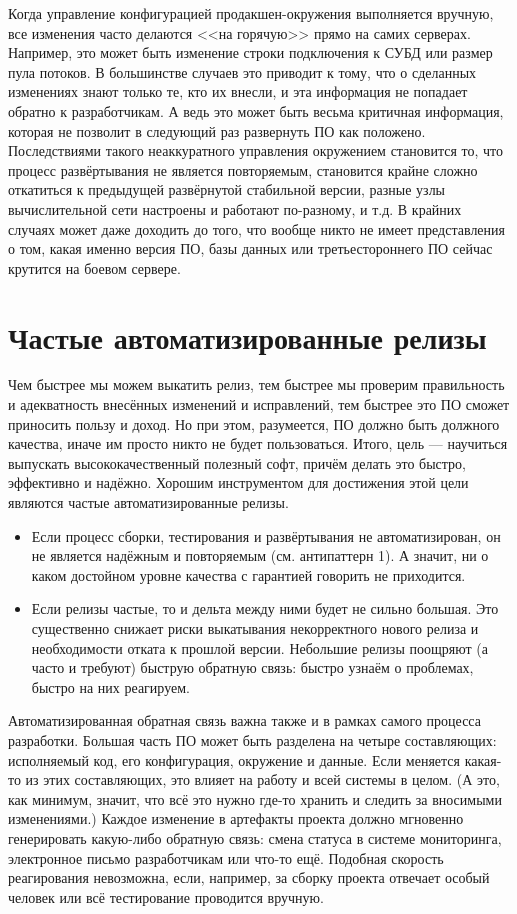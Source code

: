 \documentclass{../../text-style}
\begin{document}
Когда управление конфигурацией продакшен-окружения выполняется вручную, все изменения часто делаются <<на горячую>> прямо на самих серверах. Например, это может быть изменение строки подключения к СУБД или размер пула потоков. В большинстве случаев это приводит к тому, что о сделанных изменениях знают только те, кто их внесли, и эта информация не попадает обратно к разработчикам. А ведь это может быть весьма критичная информация, которая не позволит в следующий раз развернуть ПО как положено. Последствиями такого неаккуратного управления окружением становится то, что процесс развёртывания не является повторяемым, становится крайне сложно откатиться к предыдущей развёрнутой стабильной версии, разные узлы вычислительной сети настроены и работают по-разному, и т.д. В крайних случаях может даже доходить до того, что вообще никто не имеет представления о том, какая именно версия ПО, базы данных или третьестороннего ПО сейчас крутится на боевом сервере.

\section{Частые автоматизированные релизы}

Чем быстрее мы можем выкатить релиз, тем быстрее мы проверим правильность и адекватность внесённых изменений и исправлений, тем быстрее это ПО сможет приносить пользу и доход. Но при этом, разумеется, ПО должно быть должного качества, иначе им просто никто не будет пользоваться. Итого, цель --- научиться выпускать высококачественный полезный софт, причём делать это быстро, эффективно и надёжно. Хорошим инструментом для достижения этой цели являются частые автоматизированные релизы. 

\begin{itemize}
    \item Если процесс сборки, тестирования и развёртывания не автоматизирован, он не является надёжным и повторяемым (см. антипаттерн 1). А значит, ни о каком достойном уровне качества с гарантией говорить не приходится.
    \item Если релизы частые, то и дельта между ними будет не сильно большая. Это существенно снижает риски выкатывания некорректного нового релиза и необходимости отката к прошлой версии. Небольшие релизы поощряют (а часто и требуют) быструю обратную связь: быстро узнаём о проблемах, быстро на них реагируем.
\end{itemize}

Автоматизированная обратная связь важна также и в рамках самого процесса разработки. Большая часть ПО может быть разделена на четыре составляющих: исполняемый код, его конфигурация, окружение и данные. Если меняется какая-то из этих составляющих, это влияет на работу и всей системы в целом. (А это, как минимум, значит, что всё это нужно где-то хранить и следить за вносимыми изменениями.) Каждое изменение в артефакты проекта должно мгновенно генерировать какую-либо обратную связь: смена статуса в системе мониторинга, электронное письмо разработчикам или что-то ещё. Подобная скорость реагирования невозможна, если, например, за сборку проекта отвечает особый человек или всё тестирование проводится вручную.
\end{document}
